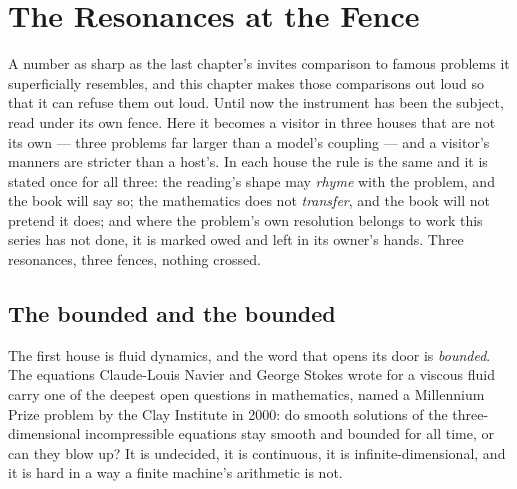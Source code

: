 \chapter{The Resonances at the Fence}

A number as sharp as the last chapter's invites comparison to famous
problems it superficially resembles, and this chapter makes those
comparisons out loud so that it can refuse them out loud. Until now the
instrument has been the subject, read under its own fence. Here it becomes
a visitor in three houses that are not its own --- three problems far
larger than a model's coupling --- and a visitor's manners are stricter
than a host's. In each house the rule is the same and it is stated once for
all three: the reading's shape may \emph{rhyme} with the problem, and the
book will say so; the mathematics does not \emph{transfer}, and the book
will not pretend it does; and where the problem's own resolution belongs to
work this series has not done, it is marked owed and left in its owner's
hands. Three resonances, three fences, nothing crossed.

\section*{The bounded and the bounded}

The first house is fluid dynamics, and the word that opens its door is
\emph{bounded}. The equations Claude-Louis Navier and George Stokes wrote
for a viscous fluid carry one of the deepest open questions in
mathematics, named a Millennium Prize problem by the Clay Institute in
2000: do smooth solutions of the three-dimensional incompressible
equations stay smooth and bounded for all time, or can they blow up? It is
undecided, it is continuous, it is infinite-dimensional, and it is hard in
a way a finite machine's arithmetic is not.

